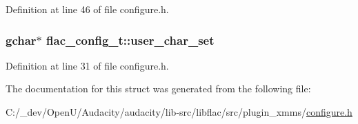 Definition at line 46 of file configure.\+h.

\subsubsection[{\texorpdfstring{user\+\_\+char\+\_\+set}{user_char_set}}]{\setlength{\rightskip}{0pt plus 5cm}gchar$\ast$ flac\+\_\+config\+\_\+t\+::user\+\_\+char\+\_\+set}\hypertarget{structflac__config__t_a86a1b0fecc95d250a041ab9e8b083342}{}\label{structflac__config__t_a86a1b0fecc95d250a041ab9e8b083342}


Definition at line 31 of file configure.\+h.



The documentation for this struct was generated from the following file\+:\begin{DoxyCompactItemize}
\item 
C\+:/\+\_\+dev/\+Open\+U/\+Audacity/audacity/lib-\/src/libflac/src/plugin\+\_\+xmms/\hyperlink{configure_8h}{configure.\+h}\end{DoxyCompactItemize}

